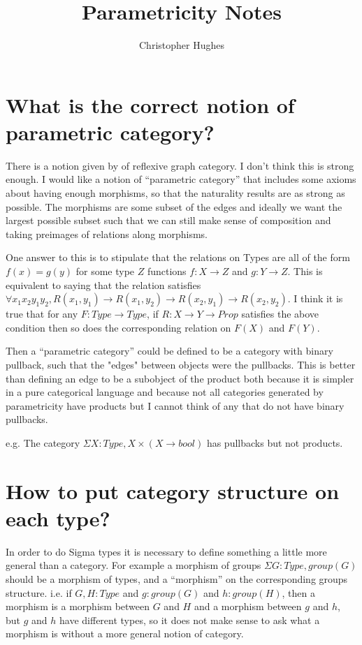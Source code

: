 \documentclass[12pt]{article} %
\title{Parametricity Notes}
\author{Christopher Hughes}
\theoremstyle{definition}
\theoremstyle{definition}
\theoremstyle{definition}
\theoremstyle{definition}
\begin{document}
\section{What is the correct notion of parametric category?}

There is a notion given by \cite{Hermida2014LogicalRA} of reflexive graph category. 
I don't think this is strong enough. I would like a notion of ``parametric category'' that
includes some axioms about having enough morphisms, so that the naturality results are as strong as
possible. The morphisms are some subset of the edges and ideally we want the largest 
possible subset such that we can still make sense of composition and taking preimages of relations
along morphisms.

One answer to this is to stipulate that the relations on Types are all of the form $f(x) = g(y)$ for 
some type $Z$ functions $f : X \rightarrow Z$ and $g : Y \rightarrow Z$. This is equivalent to saying
that the relation satisfies $\forall x_1 x_2 y_1 y_2, R(x_1, y_1) \rightarrow R(x_1, y_2) 
\rightarrow R(x_2, y_1) \rightarrow R(x_2, y_2)$.
I think it is true that for any $F : Type \rightarrow Type$, if $R : X \rightarrow Y \rightarrow Prop$
satisfies the above condition then so does the corresponding relation on $F(X)$ and $F(Y)$.

Then a ``parametric category'' could be defined to be a category with binary pullback, such that 
the "edges" between objects were the pullbacks. This is better than defining an edge to be a subobject 
of the product both because it is simpler in a pure categorical language and because not all categories
generated by parametricity have products but I cannot think of any that do not have binary pullbacks.

e.g. The category $\Sigma X : Type, X \times (X \to bool)$ has pullbacks but not products. 


\section{How to put category structure on each type?}



In order to do Sigma types it is necessary to define something a little more general than a category.
For example a morphism of groups $\Sigma G : Type, group(G)$ should be a morphism of types, and a ``morphism''
on the corresponding groups structure. i.e. if $G, H : Type$ and $g : group(G)$ and $h : group(H)$,
then a morphism is a morphism between $G$ and $H$ and a morphism between $g$ and $h$, but $g$ and $h$ have 
different types, so it does not make sense to ask what a morphism is without a more general notion of category.
\end{document}
